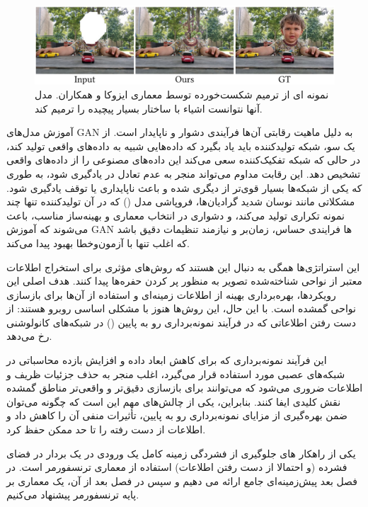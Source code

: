 \begin{figure}
	\centering
	\includegraphics[width=1\linewidth]{IISUKfail}
	\caption{نمونه ای از ترمیم شکست‌خورده توسط معماری ایزوکا و همکاران. مدل آنها نتوانست اشیاء با ساختار بسیار پیچیده را ترمیم کند.}
	\label{fig:iisukfail}
\end{figure}



آموزش مدل‌های GAN به دلیل ماهیت رقابتی آن‌ها فرآیندی دشوار و ناپایدار است. از یک سو، شبکه تولیدکننده باید یاد بگیرد که داده‌هایی شبیه به داده‌های واقعی تولید کند، در حالی که شبکه تفکیک‌کننده سعی می‌کند این داده‌های مصنوعی را از داده‌های واقعی تشخیص دهد. این رقابت مداوم می‌تواند منجر به عدم تعادل در یادگیری شود، به طوری که یکی از شبکه‌ها بسیار قوی‌تر از دیگری شده و باعث ناپایداری یا توقف یادگیری شود. مشکلاتی مانند نوسان شدید گرادیان‌ها، فروپاشی مدل () که در آن تولیدکننده تنها چند نمونه تکراری تولید می‌کند، و دشواری در انتخاب معماری و بهینه‌ساز مناسب، باعث می‌شوند که آموزش GAN ها فرایندی حساس، زمان‌بر و نیازمند تنظیمات دقیق باشد که اغلب تنها با آزمون‌وخطا بهبود پیدا می‌کند.

این استراتژی‌ها همگی به دنبال این هستند که روش‌های مؤثری برای استخراج اطلاعات معتبر از نواحی شناخته‌شده تصویر به منظور پر کردن حفره‌ها پیدا کنند. هدف اصلی این رویکردها، بهره‌برداری بهینه از اطلاعات زمینه‌ای و استفاده از آن‌ها برای بازسازی نواحی گمشده است. با این حال، این روش‌ها هنوز با مشکلی اساسی روبرو هستند: از دست رفتن اطلاعاتی که در فرآیند نمونه‌برداری رو به پایین () در شبکه‌های کانولوشنی رخ می‌دهد.  

این فرآیند نمونه‌برداری که برای کاهش ابعاد داده و افزایش بازده محاسباتی در شبکه‌های عصبی مورد استفاده قرار می‌گیرد، اغلب منجر به حذف جزئیات ظریف و اطلاعات ضروری می‌شود که می‌توانند برای بازسازی دقیق‌تر و واقعی‌تر مناطق گمشده نقش کلیدی ایفا کنند. بنابراین، یکی از چالش‌های مهم این است که چگونه می‌توان ضمن بهره‌گیری از مزایای نمونه‌برداری رو به پایین، تأثیرات منفی آن را کاهش داد و اطلاعات از دست رفته را تا حد ممکن حفظ کرد.

یکی از راهکار های جلوگیری از فشردگی زمینه کامل یک ورودی در یک بردار در فضای فشرده (و احتمالا از دست رفتن اطلاعات) استفاده از معماری ترنسفورمر است. در فصل بعد پیش‌زمینه‌ای جامع ارائه می دهیم و سپس در فصل بعد از آن، یک معماری بر پایه ترنسفورمر پیشنهاد می‌کنیم.




